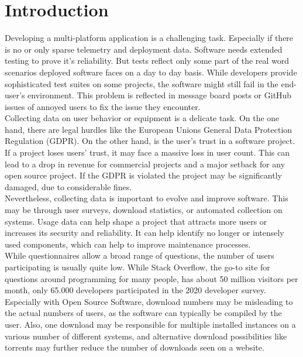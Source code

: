 \chapter{Introduction}
\label{chap:introduction}
%
Developing a multi-platform application is a challenging task. Especially if 
there is no or only sparse telemetry and deployment data. Software needs extended testing to prove it's reliability. But tests reflect only some part of the real word scenarios deployed software faces on a day to day basis. While developers provide sophisticated test suites on some projects, the software might still fail in the end-user's environment. This problem is reflected in message board posts or GitHub issues of annoyed users to fix the issue they encounter.\\

Collecting data on user behavior or equipment is a delicate task. On the one hand, there are legal hurdles like the European Unions General Data Protection Regulation (GDPR). On the other hand, is the user's trust in a software project. If a project loses users' trust, it may face a massive loss in user count. This can lead to a drop in revenue for commercial projects and a major setback for any open source project. If the GDPR is violated the project may be significantly damaged, due to considerable fines.\\
Nevertheless, collecting data is important to evolve and improve software. This may be through user surveys, download statistics, or automated collection on systems.
Usage data can help shape a project that attracts more users or increases its security and reliability.
It can help identify no longer or intensely used components, which can help to improve maintenance processes.\\
While questionnaires allow a broad range of questions, the number of users participating is usually quite low. While Stack Overflow, the go-to site for questions around programming for many people, has about 50 million visitors per month, only 65.000 developers participated in the 2020 developer survey\cite{noauthor_stack_nodate}.
Especially with Open Source Software, download numbers may be misleading to the actual numbers of users, as the software can typically be compiled by the user. Also, one download may be responsible for multiple installed instances on a various number of different systems, and alternative download possibilities like torrents may further reduce the number of downloads seen on a website.\\

